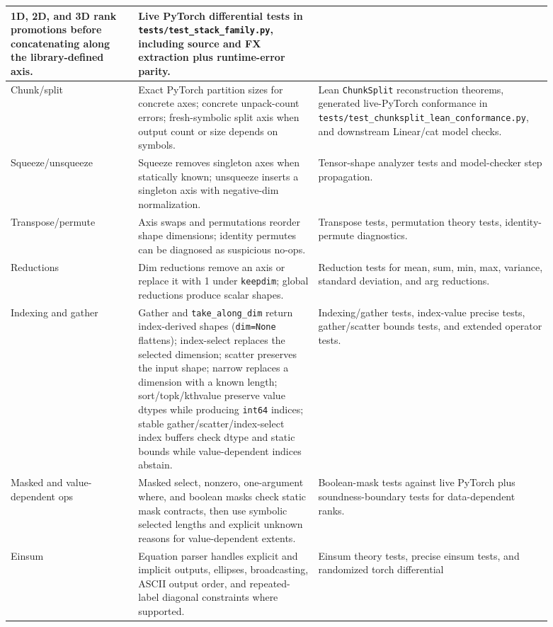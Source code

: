 \documentclass[11pt]{article}
\begin{document}
\begin{longtable}{|p{0.22\linewidth}|p{0.31\linewidth}|p{0.36\linewidth}|}
1D, 2D, and 3D rank promotions before concatenating along the library-defined
axis. &
Live PyTorch differential tests in \texttt{tests/test\_stack\_family.py},
including source and FX extraction plus runtime-error parity. \\
\hline
Chunk/split &
Exact PyTorch partition sizes for concrete axes; concrete unpack-count errors;
fresh-symbolic split axis when output count or size depends on symbols. &
Lean \texttt{ChunkSplit} reconstruction theorems, generated live-PyTorch
conformance in \texttt{tests/test\_chunksplit\_lean\_conformance.py}, and
downstream Linear/cat model checks. \\
\hline
Squeeze/unsqueeze &
Squeeze removes singleton axes when statically known; unsqueeze inserts a
singleton axis with negative-dim normalization. &
Tensor-shape analyzer tests and model-checker step propagation. \\
\hline
Transpose/permute &
Axis swaps and permutations reorder shape dimensions; identity permutes can be
diagnosed as suspicious no-ops. &
Transpose tests, permutation theory tests, identity-permute diagnostics. \\
\hline
Reductions &
Dim reductions remove an axis or replace it with 1 under \texttt{keepdim};
global reductions produce scalar shapes. &
Reduction tests for mean, sum, min, max, variance, standard deviation, and
arg reductions. \\
\hline
Indexing and gather &
Gather and \texttt{take\_along\_dim} return index-derived shapes
(\texttt{dim=None} flattens); index-select replaces the selected dimension;
scatter preserves the input shape; narrow replaces a dimension with a known
length; sort/topk/kthvalue preserve value dtypes while producing \texttt{int64}
indices; stable gather/scatter/index-select index buffers check dtype and
static bounds while value-dependent indices abstain. &
Indexing/gather tests, index-value precise tests, gather/scatter bounds tests,
and extended operator tests. \\
\hline
Masked and value-dependent ops &
Masked select, nonzero, one-argument where, and boolean masks check static mask
contracts, then use symbolic selected lengths and explicit unknown reasons for
value-dependent extents. &
Boolean-mask tests against live PyTorch plus soundness-boundary tests for
data-dependent ranks. \\
\hline
Einsum &
Equation parser handles explicit and implicit outputs, ellipses, broadcasting,
ASCII output order, and repeated-label diagonal constraints where supported. &
Einsum theory tests, precise einsum tests, and randomized torch differential

\end{longtable}
\end{document}
